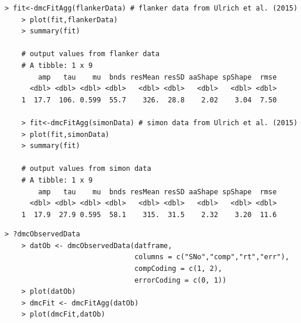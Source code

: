 \begin{minipage}{\linewidth}
    \begin{lstlisting}[style = R, title = {R Code Example 5}, captionpos = t]
    > fit<-dmcFitAgg(flankerData) # flanker data from Ulrich et al. (2015)
    > plot(fit,flankerData)
    > summary(fit)
    
    # output values from flanker data
    # A tibble: 1 x 9 
        amp   tau    mu  bnds resMean resSD aaShape spShape  rmse
      <dbl> <dbl> <dbl> <dbl>   <dbl> <dbl>   <dbl>   <dbl> <dbl>
    1  17.7  106. 0.599  55.7    326.  28.8    2.02    3.04  7.50
    
    > fit<-dmcFitAgg(simonData) # simon data from Ulrich et al. (2015)
    > plot(fit,simonData)
    > summary(fit)
    
    # output values from simon data
    # A tibble: 1 x 9
        amp   tau    mu  bnds resMean resSD aaShape spShape  rmse
      <dbl> <dbl> <dbl> <dbl>   <dbl> <dbl>   <dbl>   <dbl> <dbl>
    1  17.9  27.9 0.595  58.1    315.  31.5    2.32    3.20  11.6
    \end{lstlisting}
\end{minipage}



\begin{minipage}{\linewidth}
    \begin{lstlisting}[style = R, title = {R Code Example 6}, captionpos = t]
    > ?dmcObservedData
    > datOb <- dmcObservedData(datframe, 
                               columns = c("SNo","comp","rt","err"), 
                               compCoding = c(1, 2), 
                               errorCoding = c(0, 1)) 
    > plot(datOb)
    > dmcFit <- dmcFitAgg(datOb)
    > plot(dmcFit,datOb)
    \end{lstlisting}
\end{minipage}

